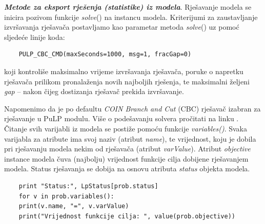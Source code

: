 \documentclass[a4paper, utf8, 11pt, colorlinks]{book}
\theoremstyle{definition}
\begin{document}
 \noindent \textbf{\emph{Metode za eksport rješenja (statistike) iz modela}}. Rješavanje modela se inicira pozivom funkcije \emph{solve}() na instancu modela. Kriterijumi za zaustavljanje izvršavanja rješavača postavljamo kao parametar metoda \emph{solve}()  uz pomoć sljedeće linije koda:
 \begin{verbatim}
    PULP_CBC_CMD(maxSeconds=1000, msg=1, fracGap=0) 
\end{verbatim}
koji kontroliše maksimalno vrijeme izvršavanja rješavača, poruke o napretku rješavača prilikom pronalaženja novih najboljih rješenja, te maksimalni željeni \emph{gap} -- nakon čijeg dostizanja rješavač prekida izvršavanje.

 Napomenimo da je po defaultu \emph{COIN Branch and Cut} (CBC) rješavač izabran za rješavanje u PuLP modulu. Više o podešavanju solvera pročitati na linku \cite{cite_key19}.   %
 Čitanje svih varijabli iz modela se postiže pomoću funkcije \emph{variables()}. Svaka varijabla za atribute ima svoj naziv (atribut \emph{name}), te vrijednost, koju je dobila pri rješavanju modela nekim od rješavača (atribut \emph{varValue}). Atribut \emph{objective} instance modela čuva (najbolju) vrijednost funkcije cilja dobijene rješavanjem modela. Status rješavanja se dobija na osnovu atributa \emph{status} objekta modela. 
 
 \begin{verbatim}
 	print "Status:", LpStatus[prob.status]
 	for v in prob.variables():
 	print(v.name, "=", v.varValue)
 	print("Vrijednost funkcije cilja: ", value(prob.objective))
  
 \end{verbatim}
\end{document}
